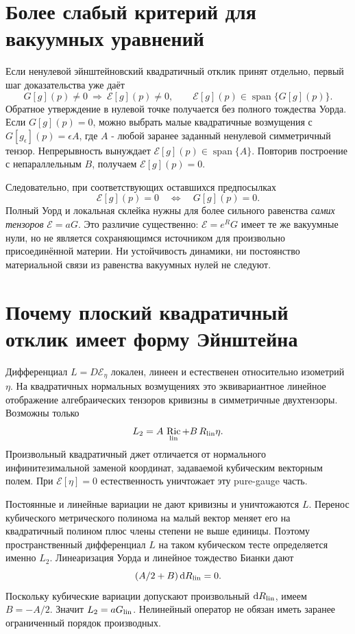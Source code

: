 \documentclass[11pt,a4paper]{article}
\newcommand{\E}{\mathcal E}
\newcommand{\dd}{\mathrm d}
\DeclareMathOperator{\Ric}{Ric}
\DeclareMathOperator{\Span}{span}
\begin{document}
\section{Более слабый критерий для вакуумных уравнений}
Если ненулевой эйнштейновский квадратичный отклик принят отдельно, первый шаг доказательства уже даёт
\[
G[g](p)\ne0\ \Longrightarrow\ \E[g](p)\ne0,\qquad
\E[g](p)\in\Span\{G[g](p)\}.
\]
Обратное утверждение в нулевой точке получается без полного тождества Уорда. Если $G[g](p)=0$, можно выбрать малые квадратичные возмущения с
$G[g_\epsilon](p)=\epsilon A$, где $A$ - любой заранее заданный ненулевой симметричный тензор. Непрерывность вынуждает
$\E[g](p)\in\Span\{A\}$. Повторив построение с непараллельным $B$, получаем $\E[g](p)=0$.

Следовательно, при соответствующих оставшихся предпосылках
\[
\boxed{\E[g](p)=0\quad\Longleftrightarrow\quad G[g](p)=0.}
\]
Полный Уорд и локальная склейка нужны для более сильного равенства \emph{самих тензоров} $\E=aG$. Это различие существенно: $\E=e^RG$ имеет те же вакуумные нули, но не является сохраняющимся источником для произвольно присоединённой материи. Ни устойчивость динамики, ни постоянство материальной связи из равенства вакуумных нулей не следуют.

\section{Почему плоский квадратичный отклик имеет форму Эйнштейна}
Дифференциал $L=D\E_\eta$ локален, линеен и естественен относительно изометрий $\eta$. На квадратичных нормальных возмущениях это эквивариантное линейное отображение алгебраических тензоров кривизны в симметричные двухтензоры. Возможны только
\[
L_2=A\,\Ric_{\rm lin}+B\,R_{\rm lin}\eta.
\]
Произвольный квадратичный джет отличается от нормального инфинитезимальной заменой координат, задаваемой кубическим векторным полем. При $\E[\eta]=0$ естественность уничтожает эту pure-gauge часть.

Постоянные и линейные вариации не дают кривизны и уничтожаются $L$. Перенос кубического метрического полинома на малый вектор меняет его на квадратичный полином плюс члены степени не выше единицы. Поэтому пространственный дифференциал $L$ на таком кубическом тесте определяется именно $L_2$. Линеаризация Уорда и линейное тождество Бианки дают
\[
(A/2+B)\,\dd R_{\rm lin}=0.
\]
Поскольку кубические вариации допускают произвольный $\dd R_{\rm lin}$, имеем $B=-A/2$. Значит $L_2=aG_{\rm lin}$. Нелинейный оператор не обязан иметь заранее ограниченный порядок производных.
\end{document}
